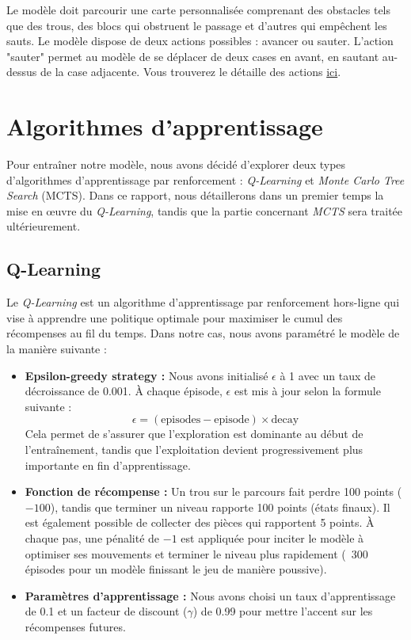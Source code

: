 \documentclass[a4paper,12pt]{article}
\begin{document}
        Le modèle doit parcourir une carte personnalisée comprenant des obstacles tels que des trous, des blocs qui obstruent le passage et d'autres qui empêchent les sauts. Le modèle dispose de deux actions possibles : avancer ou sauter. L'action "sauter" permet au modèle de se déplacer de deux cases en avant, en sautant au-dessus de la case adjacente. Vous trouverez le détaille des actions \href{https://www.google.com}{ici}.
    
    \section{Algorithmes d'apprentissage}
    
        Pour entraîner notre modèle, nous avons décidé d'explorer deux types d'algorithmes d'apprentissage par renforcement : \textit{Q-Learning} et \textit{Monte Carlo Tree Search} (MCTS). Dans ce rapport, nous détaillerons dans un premier temps la mise en œuvre du \textit{Q-Learning}, tandis que la partie concernant \textit{MCTS} sera traitée ultérieurement.
        
        \subsection{Q-Learning}
        
            Le \textit{Q-Learning} est un algorithme d'apprentissage par renforcement hors-ligne qui vise à apprendre une politique optimale pour maximiser le cumul des récompenses au fil du temps. Dans notre cas, nous avons paramétré le modèle de la manière suivante :
            
            \begin{itemize}
                \item \textbf{Epsilon-greedy strategy :} Nous avons initialisé $\epsilon$ à 1 avec un taux de décroissance de 0.001. À chaque épisode, $\epsilon$ est mis à jour selon la formule suivante : 
                \[
                \epsilon = (\text{episodes} - \text{episode}) \times \text{decay}
                \]
                Cela permet de s'assurer que l'exploration est dominante au début de l'entraînement, tandis que l'exploitation devient progressivement plus importante en fin d'apprentissage.
                
                \item \textbf{Fonction de récompense :} Un trou sur le parcours fait perdre 100 points ($-100$), tandis que terminer un niveau rapporte 100 points  (états finaux). Il est également possible de collecter des pièces qui rapportent 5 points. À chaque pas, une pénalité de $-1$ est appliquée pour inciter le modèle à optimiser ses mouvements et terminer le niveau plus rapidement (~300 épisodes pour un modèle finissant le jeu de manière poussive).
                
                \item \textbf{Paramètres d'apprentissage :} Nous avons choisi un taux d'apprentissage de 0.1 et un facteur de discount ($\gamma$) de 0.99 pour mettre l'accent sur les récompenses futures.
            \end{itemize}
\end{document}
